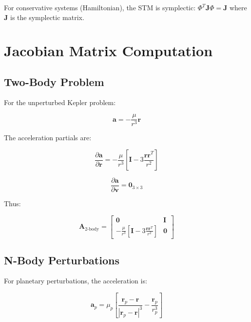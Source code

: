 For conservative systems (Hamiltonian), the STM is symplectic: $\Phi^T\mathbf{J}\Phi = \mathbf{J}$ where $\mathbf{J}$ is the symplectic matrix.

\section{Jacobian Matrix Computation}

\subsection{Two-Body Problem}

For the unperturbed Kepler problem:

\begin{equation}
    \mathbf{a} = -\frac{\mu}{r^3}\mathbf{r}
\end{equation}

The acceleration partials are:

\begin{equation}
    \frac{\partial\mathbf{a}}{\partial\mathbf{r}} = -\frac{\mu}{r^3}\left[\mathbf{I} - 3\frac{\mathbf{r}\mathbf{r}^T}{r^2}\right]
\end{equation}

\begin{equation}
    \frac{\partial\mathbf{a}}{\partial\mathbf{v}} = \mathbf{0}_{3\times3}
\end{equation}

Thus:

\begin{equation}
    \mathbf{A}_{\text{2-body}} = \begin{bmatrix}
        \mathbf{0} & \mathbf{I} \\[8pt]
        -\frac{\mu}{r^3}\left[\mathbf{I} - 3\frac{\mathbf{r}\mathbf{r}^T}{r^2}\right] & \mathbf{0}
    \end{bmatrix}
\end{equation}

\subsection{N-Body Perturbations}

For planetary perturbations, the acceleration is:

\begin{equation}
    \mathbf{a}_p = \mu_p \left[\frac{\mathbf{r}_p - \mathbf{r}}{|\mathbf{r}_p - \mathbf{r}|^3} - \frac{\mathbf{r}_p}{r_p^3}\right]
\end{equation}

